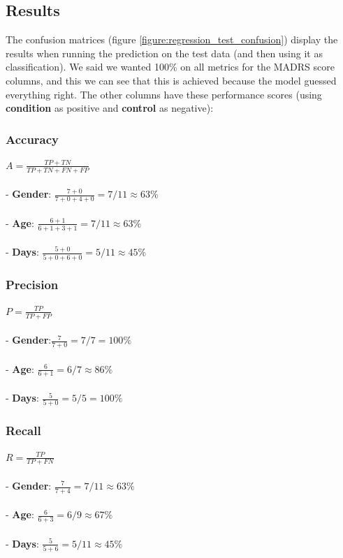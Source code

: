 \subsection{Results}

The confusion matrices (figure \ref{figure:regression_test_confusion}) display the results when running the prediction on the test data (and then using it as classification). We said we wanted 100\% on all metrics for the MADRS score columns, and this we can see that this is achieved because the model guessed everything right. The other columns have these performance scores (using \textbf{condition} as positive and \textbf{control} as negative):

\subsubsection{Accuracy}
$ A = \frac{TP+TN}{TP+TN+FN+FP} $
\\\\
- \textbf{Gender}: $\frac{7+0}{7+0+4+0} = 7/11 \approx 63\%$\\\\
- \textbf{Age}: $\frac{6+1}{6+1+3+1} = 7/11 \approx 63\%$\\\\
- \textbf{Days}: $\frac{5+0}{5+0+6+0} = 5/11 \approx 45\%$\\

\subsubsection{Precision}
$ P = \frac{TP}{TP+FP} $
\\\\
- \textbf{Gender}:$ \frac{7}{7+0} = 7/7 = 100\%$\\\\
- \textbf{Age}: $\frac{6}{6+1} = 6/7 \approx 86\%$\\\\
- \textbf{Days}: $\frac{5}{5+0} = 5/5 = 100\%$\\

\subsubsection{Recall}
$ R = \frac{TP}{TP+FN} $
\\\\
- \textbf{Gender}: $\frac{7}{7+4} = 7/11 \approx 63\%$\\\\
- \textbf{Age}: $\frac{6}{6+3} = 6/9 \approx 67\%$\\\\
- \textbf{Days}: $\frac{5}{5+6} = 5/11 \approx 45\%$

